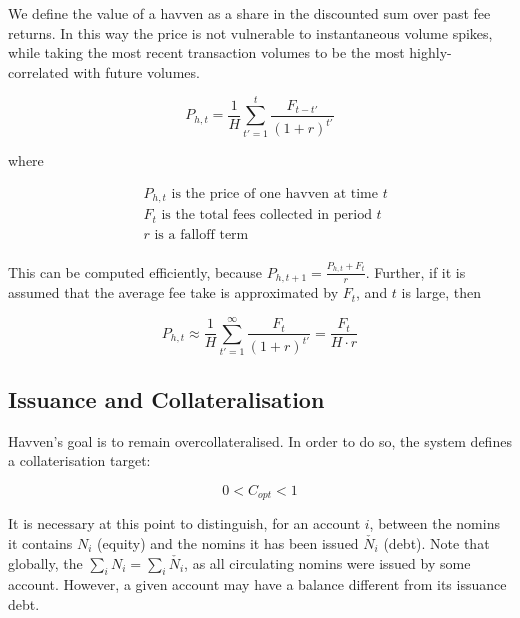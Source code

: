 \noindent We define the value of a havven as a share in the discounted sum over past fee returns.
In this way the price is not vulnerable to instantaneous volume spikes, while
taking the most recent transaction volumes to be the most highly-correlated with future volumes.

\begin{equation}
    P_{h,t} = \frac{1}{H} \sum_{t'=1}^{t} \frac{F_{t - t'}}{(1 + r)^{t'}} \label{eq:price}
\end{equation}

where

\begin{align*} 
& P_{h,t} \text{ is the price of one havven at time } t  \\
& F_t \text{ is the total fees collected in period } t\\
& r \text{ is a falloff term}  \\
\end{align*}

\newpage

\noindent This can be computed efficiently, because $P_{h,t+1} = \frac{P_{h,t} + F_t}{r}$. 
Further, if it is assumed that the average fee take is approximated by $F_t$, and $t$ is large, then

\begin{equation}
    P_{h,t} \approx \frac{1}{H} \sum_{t'=1}^{\infty} \frac{F_t}{(1 + r)^{t'}} = \frac{F_t}{H \cdot r}
\end{equation}


\subsection{Issuance and Collateralisation} 


\noindent Havven's goal is to remain overcollateralised. In order to do so, the system defines a collaterisation target:

\begin{equation}
0 < C_{opt} < 1  \label{eq:target}
\end{equation}

\vspace{3 mm}

\noindent It is necessary at this point to distinguish, for an account $i$, between the nomins it contains $N_i$ (equity) and the nomins it has been issued $\check{N_i}$ (debt). Note that globally, the $\sum_{i}N_i = \sum_{i}\check{N_i}$, as all circulating nomins were issued by some account. However, a given account may have a balance different from its issuance debt.\\

